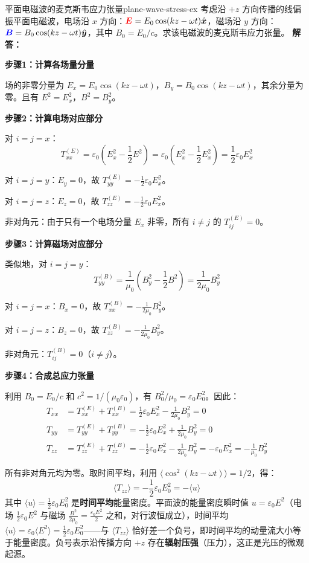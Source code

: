 \documentclass[11pt,a4paper,openany,oneside]{book}
\newcommand{\vecE}{\textcolor{red}{\vect{E}}}
\newcommand{\vecB}{\textcolor{blue}{\vect{B}}}
\newcommand{\eps}{\varepsilon}
\newcommand{\muz}{\mu_0}
\newcommand{\vect}[1]{\bm{#1}}
\newcommand{\unitvec}[1]{\hat{\vect{#1}}}
\newcommand{\difficulty}[1]{\marginnote{\textcolor{red}{\textbf{[#1]}}}}
\begin{document}
\begin{example}{平面电磁波的麦克斯韦应力张量}{plane-wave-stress-ex}
\difficulty{提高}
考虑沿 $+z$ 方向传播的线偏振平面电磁波，电场沿 $x$ 方向：$\vecE = E_0\cos(kz-\omega t)\unitvec{x}$，磁场沿 $y$ 方向：$\vecB = B_0\cos(kz-\omega t)\unitvec{y}$，其中 $B_0 = E_0/c$。求该电磁波的麦克斯韦应力张量。
\tcblower
\textbf{解答：}

\textbf{步骤1：计算各场量分量}

场的非零分量为 $E_x = E_0\cos(kz-\omega t)$，$B_y = B_0\cos(kz-\omega t)$，其余分量为零。且有 $E^2 = E_x^2$，$B^2 = B_y^2$。

\textbf{步骤2：计算电场对应部分}

对 $i=j=x$：
\[
T_{xx}^{(E)} = \eps_0\left(E_x^2 - \frac{1}{2}E^2\right) = \eps_0\left(E_x^2 - \frac{1}{2}E_x^2\right) = \frac{1}{2}\eps_0 E_x^2
\]

对 $i=j=y$：$E_y=0$，故 $T_{yy}^{(E)} = -\frac{1}{2}\eps_0 E_x^2$。

对 $i=j=z$：$E_z=0$，故 $T_{zz}^{(E)} = -\frac{1}{2}\eps_0 E_x^2$。

非对角元：由于只有一个电场分量 $E_x$ 非零，所有 $i\neq j$ 的 $T_{ij}^{(E)} = 0$。

\textbf{步骤3：计算磁场对应部分}

类似地，对 $i=j=y$：
\[
T_{yy}^{(B)} = \frac{1}{\muz}\left(B_y^2 - \frac{1}{2}B^2\right) = \frac{1}{2\muz}B_y^2
\]

对 $i=j=x$：$B_x=0$，故 $T_{xx}^{(B)} = -\frac{1}{2\muz}B_y^2$。

对 $i=j=z$：$B_z=0$，故 $T_{zz}^{(B)} = -\frac{1}{2\muz}B_y^2$。

非对角元：$T_{ij}^{(B)} = 0$（$i\neq j$）。

\textbf{步骤4：合成总应力张量}

利用 $B_0 = E_0/c$ 和 $c^2 = 1/(\muz\eps_0)$，有 $B_0^2/\muz = \eps_0 E_0^2$。因此：
\begin{align*}
T_{xx} &= T_{xx}^{(E)} + T_{xx}^{(B)} = \frac{1}{2}\eps_0 E_x^2 - \frac{1}{2\muz}B_y^2 = 0 \\
T_{yy} &= T_{yy}^{(E)} + T_{yy}^{(B)} = -\frac{1}{2}\eps_0 E_x^2 + \frac{1}{2\muz}B_y^2 = 0 \\
T_{zz} &= T_{zz}^{(E)} + T_{zz}^{(B)} = -\frac{1}{2}\eps_0 E_x^2 - \frac{1}{2\muz}B_y^2 = -\eps_0 E_x^2 = -\frac{1}{\muz}B_y^2
\end{align*}

所有非对角元均为零。取时间平均，利用 $\langle\cos^2(kz-\omega t)\rangle = 1/2$，得：
\[
\langle T_{zz}\rangle = -\frac{1}{2}\eps_0 E_0^2 = -\langle u\rangle
\]
其中 $\langle u\rangle = \frac{1}{2}\eps_0 E_0^2$ 是\textbf{时间平均}能量密度。平面波的能量密度瞬时值 $u = \eps_0 E^2$（电场 $\frac12\eps_0 E^2$ 与磁场 $\frac{B^2}{2\muz} = \frac{\eps_0 E^2}{2}$ 之和，对行波恒成立），时间平均 $\langle u\rangle = \eps_0\langle E^2\rangle = \frac12\eps_0 E_0^2$——与 $\langle T_{zz}\rangle$ 恰好差一个负号，即时间平均的动量流大小等于能量密度。负号表示沿传播方向 $+z$ 存在\textbf{辐射压强}（压力），这正是光压的微观起源。
\end{example}
\end{document}
